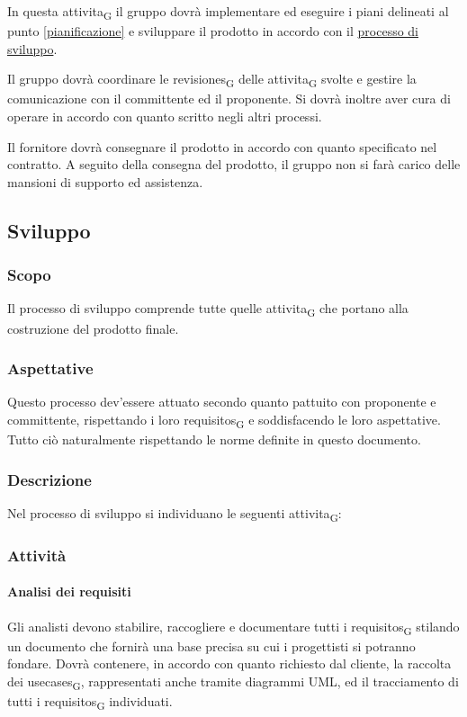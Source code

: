             In questa \gls{attivita}\textsubscript{G} il gruppo \group{} dovrà implementare ed eseguire i piani delineati al punto \ref{pianificazione} e sviluppare il prodotto in accordo con il \hyperref[sviluppo]{processo di sviluppo}.

            Il gruppo dovrà coordinare le \glspl{revisione}\textsubscript{G} delle \gls{attivita}\textsubscript{G} svolte e gestire la comunicazione con il committente ed il proponente. Si dovrà inoltre aver cura di operare in accordo con quanto scritto negli altri processi.


            Il fornitore dovrà consegnare il prodotto in accordo con quanto specificato nel contratto. A seguito della consegna del prodotto, il gruppo \group{}  non si farà carico delle mansioni di supporto ed assistenza.

\subsection{Sviluppo}
\label{sviluppo}
    \subsubsection{Scopo}
        Il processo di sviluppo comprende tutte quelle \gls{attivita}\textsubscript{G} che portano alla costruzione del prodotto finale.
    \subsubsection{Aspettative}
        Questo processo dev'essere attuato secondo quanto pattuito con proponente e committente, rispettando i loro \glspl{requisito}\textsubscript{G} e soddisfacendo le loro aspettative. Tutto ciò naturalmente rispettando le norme definite in questo documento.
    \subsubsection{Descrizione}
        Nel processo di sviluppo si individuano  le seguenti \gls{attivita}\textsubscript{G}:

    \subsubsection{Attività}
        \paragraph{Analisi dei requisiti}
                Gli analisti devono stabilire, raccogliere e documentare tutti i \glspl{requisito}\textsubscript{G} stilando un documento che fornirà una base precisa su cui i progettisti si potranno fondare. Dovrà contenere, in accordo con quanto richiesto dal cliente, la raccolta dei \glspl{usecase}\textsubscript{G}, rappresentati anche tramite diagrammi UML, ed il tracciamento di tutti i \glspl{requisito}\textsubscript{G} individuati.


